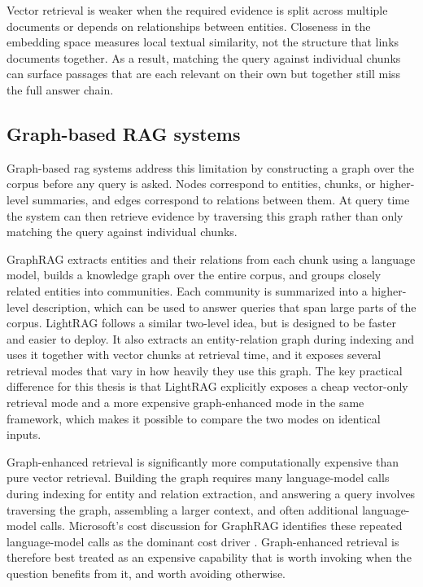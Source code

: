 \documentclass[english, bibtex]{kththesis}               %
\numberwithin{listing}{chapter}
\begin{document}
Vector retrieval is weaker when the required evidence is split across multiple documents or depends on relationships between entities. Closeness in the embedding space measures local textual similarity, not the structure that links documents together. As a result, matching the query against individual chunks can surface passages that are each relevant on their own but together still miss the full answer chain.

\subsection{Graph-based RAG systems}
\label{sec:backgroundGraphSystems}

Graph-based \gls{rag} systems address this limitation by constructing a graph over the corpus before any query is asked. Nodes correspond to entities, chunks, or higher-level summaries, and edges correspond to relations between them. At query time the system can then retrieve evidence by traversing this graph rather than only matching the query against individual chunks.

GraphRAG \cite{edge2024graphrag} extracts entities and their relations from each chunk using a language model, builds a knowledge graph over the entire corpus, and groups closely related entities into communities. Each community is summarized into a higher-level description, which can be used to answer queries that span large parts of the corpus. LightRAG \cite{lightrag2024} follows a similar two-level idea, but is designed to be faster and easier to deploy. It also extracts an entity-relation graph during indexing and uses it together with vector chunks at retrieval time, and it exposes several retrieval modes that vary in how heavily they use this graph. The key practical difference for this thesis is that LightRAG explicitly exposes a cheap vector-only retrieval mode and a more expensive graph-enhanced mode in the same framework, which makes it possible to compare the two modes on identical inputs.

Graph-enhanced retrieval is significantly more computationally expensive than pure vector retrieval. Building the graph requires many language-model calls during indexing for entity and relation extraction, and answering a query involves traversing the graph, assembling a larger context, and often additional language-model calls. Microsoft's cost discussion for GraphRAG identifies these repeated language-model calls as the dominant cost driver \cite{edge2024graphrag,microsoft2024graphragcosts}. Graph-enhanced retrieval is therefore best treated as an expensive capability that is worth invoking when the question benefits from it, and worth avoiding otherwise.
\end{document}
